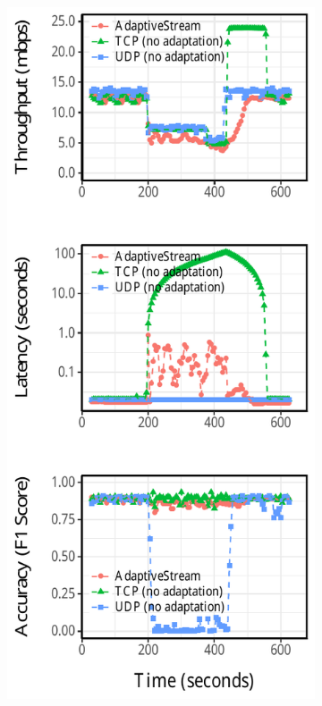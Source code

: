 \begin{figure}[!htb]
  \begin{subfigure}[t]{0.3\textwidth}
    \centering
    \includegraphics[width=\textwidth]{figures/runtime-mot-verticle.pdf}

\end{subfigure}
\end{figure}
